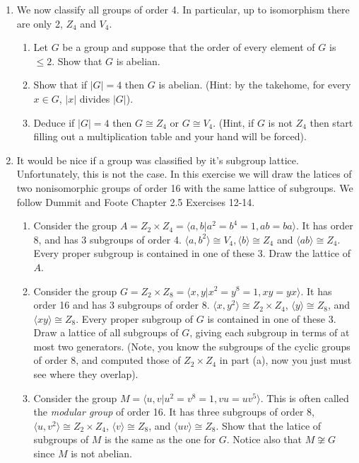 \documentclass[11pt]{article}
\newcommand{\la}{\langle}
\newcommand{\ra}{\rangle}
\begin{document}
\begin{enumerate}
  \item We now classify all groups of order 4.  In particular, up to isomorphism there are only 2, $Z_4$ and $V_4$.
  \begin{enumerate}
    \item  Let $G$ be a group and suppose that the order of every element of $G$ is $\le2$.  Show that $G$ is abelian.
    \item Show that if $|G|=4$ then $G$ is abelian.  (Hint: by the takehome, for every $x\in G$, $|x|$ divides $|G|$).
    \item Deduce if $|G|=4$ then $G\cong Z_4$ or $G\cong V_4$. (Hint, if $G$ is not $Z_4$ then start filling out a multiplication table and your hand will be forced).
  \end{enumerate}
  \item It would be nice if a group was classified by it's subgroup lattice.  Unfortunately, this is not the case.  In this exercise we will draw the latices of two nonisomorphic groups of order 16 with the same lattice of subgroups.  We follow Dummit and Foote Chapter 2.5 Exercises 12-14.
  \begin{enumerate}
    \item Consider the group $A = Z_2\times Z_4 = \la a,b |a^2=b^4=1, ab=ba\ra$.  It has order 8, and has 3 subgroups of order 4.  $\la a,b^2\ra\cong V_4, \la b\ra\cong Z_4$ and $\la ab\ra\cong Z_4$.  Every proper subgroup is contained in one of these 3.  Draw the lattice of $A$.
    \item  Consider the group $G = Z_2\times Z_8 = \la x,y | x^2=y^8=1, xy=yx\ra$.  It has order 16 and has 3 subgroups of order 8.  $\la x,y^2\ra\cong Z_2\times Z_4$, $\la y\ra\cong Z_8$, and $\la xy\ra\cong Z_8$.  Every proper subgroup of $G$ is contained in one of these 3.  Draw a lattice of all subgroups of $G$, giving each subgroup in terms of at most two generators.  (Note, you know the subgroups of the cyclic groups of order 8, and computed those of $Z_2\times Z_4$ in part (a), now you just must see where they overlap).
    \item Consider the group $M = \la u,v|u^2=v^8=1, vu=uv^5\ra$.  This is often called the \textit{modular group} of order 16.  It has three subgroups of order 8, $\la u,v^2\ra\cong Z_2\times Z_4$, $\la v\ra\cong Z_8$, and $\la uv\ra\cong Z_8$.  Show that the latice of subgroups of $M$ is the same as the one for $G$.  Notice also that $M\not\cong G$ since $M$ is not abelian.
  \end{enumerate}
\end{enumerate}
\end{document}
